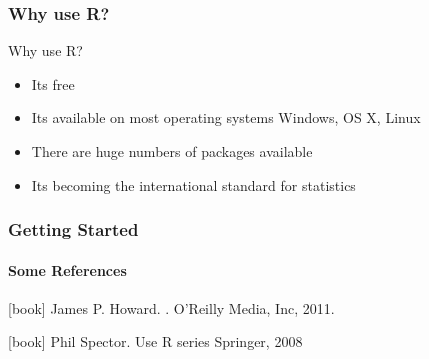 \documentclass[12pt]{beamer}\usepackage[]{graphicx}\usepackage[]{color}
\begin{document}
\begin{frame}
  \frametitle{Why use R?}
  \begin{block}{Why use R?}
  \begin{itemize}
    \item Its free
    \item Its available on most operating systems Windows, OS X, Linux
    \item There are huge numbers of packages available
    \item Its becoming the international standard for statistics
  \end{itemize}
  \end{block}
\end{frame}


\begin{frame}[allowframebreaks]
\frametitle{Getting Started}
  \framesubtitle{Some References}
  \begin{thebibliography}{10}    
  [book]
    James P. Howard.
    .
    \newblock O'Reilly Media, Inc, 2011.
 
  [book]
    Phil Spector.
    \newblock Use R series 
    \newblock Springer, 2008
  \end{thebibliography}
\end{frame}
\end{document}
